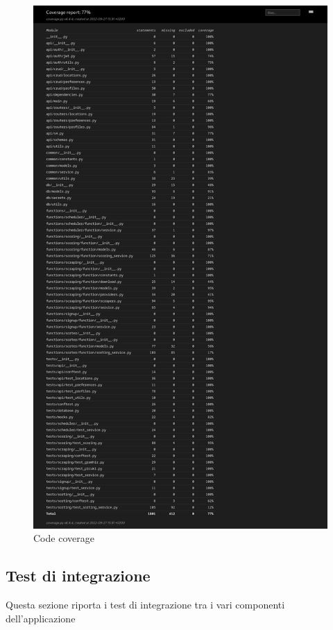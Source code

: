     \begin{figure}[H]
        \centering
        \includegraphics[scale = 0.3]{sezioni/Images/backend_code_coverage.png}
        \caption{Code coverage}
    \end{figure}
    
 
\subsection{Test di integrazione}
    Questa sezione riporta i test di integrazione tra i vari componenti dell'applicazione

